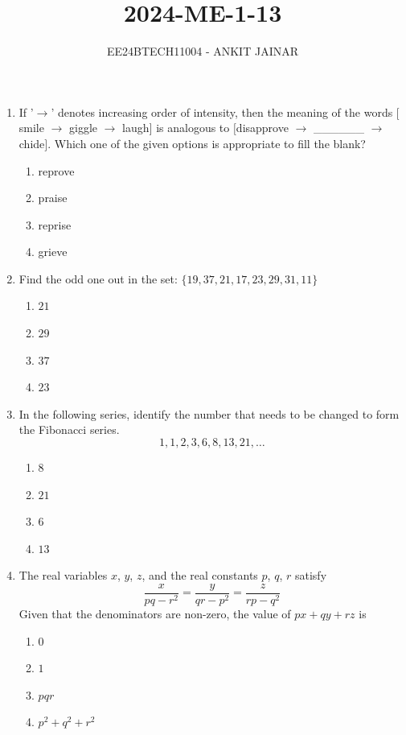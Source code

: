 \documentclass[journal,12pt,onecolumn]{IEEEtran}
\theoremstyle{remark}
\begin{document}

\vspace{3cm}

\title{2024-ME-1-13}
\author{EE24BTECH11004 - ANKIT JAINAR}
\maketitle
\bigskip

\renewcommand{\thefigure}{\theenumi}
\renewcommand{\thetable}{\theenumi}
\setlength{\columnsep}{2.5em}
\begin{enumerate}
\item If '$\to$' denotes increasing order of intensity, then the meaning of the words 
$[$smile $\to$ giggle $\to$ laugh$]$ is analogous to $[$disapprove $\to$ \_\_\_\_\_\_ $\to$ chide$]$. 
Which one of the given options is appropriate to fill the blank?
\begin{enumerate}
    \item reprove
    \item praise
    \item reprise
    \item grieve
\end{enumerate}

\item Find the odd one out in the set: $\{19, 37, 21, 17, 23, 29, 31, 11\}$
\begin{enumerate}
    \item $21$
    \item $29$
    \item $37$
    \item $23$
\end{enumerate}
\item In the following series, identify the number that needs to be changed to form the Fibonacci series. 
\[
1, 1, 2, 3, 6, 8, 13, 21, \dots
\]
\begin{enumerate}
    \item $8$
    \item $21$
    \item $6$
    \item $13$
\end{enumerate}

\item The real variables $x$, $y$, $z$, and the real constants $p$, $q$, $r$ satisfy
\[
\frac{x}{pq - r^2} = \frac{y}{qr - p^2} = \frac{z}{rp - q^2}
\]
Given that the denominators are non-zero, the value of $px + qy + rz$ is
\begin{enumerate}
    \item $0$
    \item $1$
    \item $pqr$
    \item $p^2 + q^2 + r^2$
\end{enumerate}


\end{enumerate}
\end{document}
